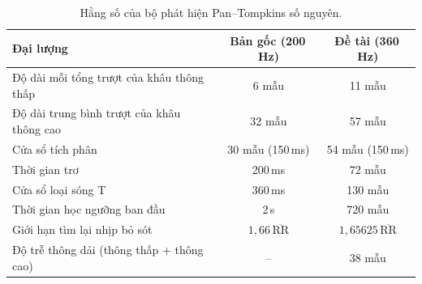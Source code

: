 \begin{table}[htbp]
  \centering
  \caption{Hằng số của bộ phát hiện Pan--Tompkins số nguyên.}\label{tab:plb-pt}
  \begin{tabular}{lcc}
    \toprule
    Đại lượng & Bản gốc (200\,Hz) & Đề tài (360\,Hz) \\
    \midrule
    Độ dài mỗi tổng trượt của khâu thông thấp & 6 mẫu & 11 mẫu \\
    Độ dài trung bình trượt của khâu thông cao & 32 mẫu & 57 mẫu \\
    Cửa sổ tích phân & 30 mẫu (150\,ms) & 54 mẫu (150\,ms) \\
    Thời gian trơ & 200\,ms & 72 mẫu \\
    Cửa sổ loại sóng T & 360\,ms & 130 mẫu \\
    Thời gian học ngưỡng ban đầu & 2\,s & 720 mẫu \\
    Giới hạn tìm lại nhịp bỏ sót & $1{,}66\,\overline{\mathrm{RR}}$ & $1{,}65625\,\overline{\mathrm{RR}}$ \\
    Độ trễ thông dải (thông thấp + thông cao) & -- & 38 mẫu \\
    \bottomrule
  \end{tabular}
\end{table}

